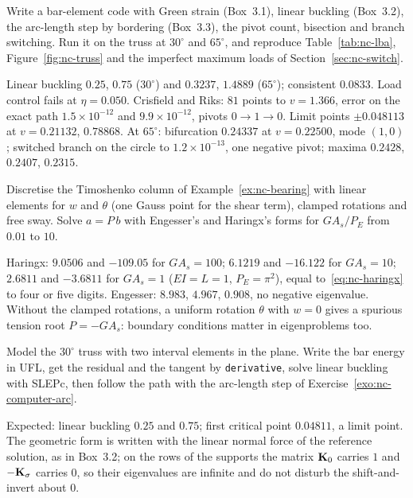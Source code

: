 
\label{exo:nc-computer-arc}
%
Write a bar-element code with Green strain (Box~3.1), linear buckling (Box~3.2), the
arc-length step by bordering (Box~3.3), the pivot count, bisection and branch switching.
Run it on the truss at $30^\circ$ and $65^\circ$, and reproduce Table~\ref{tab:nc-lba},
Figure~\ref{fig:nc-truss} and the imperfect maximum loads of Section~\ref{sec:nc-switch}.
\begin{solution}
Linear buckling $0.25$, $0.75$ ($30^\circ$) and $0.3237$, $1.4889$ ($65^\circ$); consistent
$0.0833$. Load control fails at $\eta = 0.050$. Crisfield and Riks: $81$ points to $v = 1.366$,
error on the exact path $1.5\times10^{-12}$ and $9.9\times10^{-12}$, pivots $0\to1\to0$. Limit
points $\pm0.048113$ at $v = 0.21132$, $0.78868$. At $65^\circ$: bifurcation $0.24337$ at
$v = 0.22500$, mode $(1,0)$; switched branch on the circle to $1.2\times10^{-13}$, one negative
pivot; maxima $0.2428$, $0.2407$, $0.2315$.


\end{solution}

\label{exo:nc-computer-bearing}
%
Discretise the Timoshenko column of Example~\ref{ex:nc-bearing} with linear elements for $w$
and $\theta$ (one Gauss point for the shear term), clamped rotations and free sway. Solve
$a = P\,b$ with Engesser's and Haringx's forms for $GA_s/P_E$ from $0.01$ to $10$.
\begin{solution}
Haringx: $9.0506$ and $-109.05$ for $GA_s = 100$; $6.1219$ and $-16.122$ for $GA_s = 10$; $2.6811$
and $-3.6811$ for $GA_s = 1$ ($EI = L = 1$, $P_E = \pi^2$), equal to~\eqref{eq:nc-haringx} to
four or five digits. Engesser: $8.983$, $4.967$, $0.908$, no negative eigenvalue. Without the
clamped rotations, a uniform rotation $\theta$ with $w = 0$ gives a spurious tension root
$P = -GA_s$: boundary conditions matter in eigenproblems too.

\end{solution}

\label{exo:nc-computer-fenics}
%
Model the $30^\circ$ truss with two interval elements in the plane. Write the bar energy in
UFL, get the residual and the tangent by \texttt{derivative}, solve linear buckling with
SLEPc, then follow the path with the arc-length step of Exercise~\ref{exo:nc-computer-arc}.
\begin{solution}
Expected: linear buckling $0.25$ and $0.75$; first critical point $0.04811$, a limit point.
The geometric form is written with the linear normal force of the reference solution, as in
Box~3.2; on the rows of the supports the matrix $\mathbf{K}_0$ carries $1$ and $-\mathbf{K}_\sigma$
carries $0$, so their eigenvalues are infinite and do not disturb the shift-and-invert
about $0$.

\end{solution}

